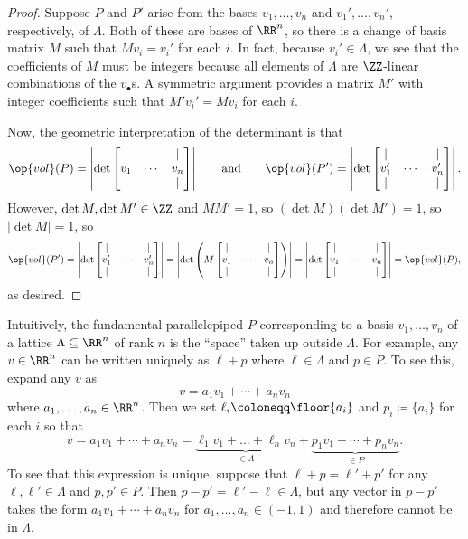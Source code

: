 \documentclass[../notes.tex]{subfiles}
\begin{document}
\begin{proof}
	Suppose $P$ and $P'$ arise from the bases $v_1,\ldots,v_n$ and $v_1',\ldots,v_n'$, respectively, of $\Lambda$. Both of these are bases of $\RR^n$, so there is a change of basis matrix $M$ such that $Mv_i=v_i'$ for each $i$. In fact, because $v_i'\in\Lambda$, we see that the coefficients of $M$ must be integers because all elements of $\Lambda$ are $\ZZ$-linear combinations of the $v_\bullet$s. A symmetric argument provides a matrix $M'$ with integer coefficients such that $M'v_i'=Mv_i$ for each $i$.

	Now, the geometric interpretation of the determinant is that
	\[\op{vol}(P)=\left|\det\begin{bmatrix}
		| & & | \\
		v_1 & \cdots & v_n \\
		| & & |
	\end{bmatrix}\right|\qquad\text{and}\qquad\op{vol}(P')=\left|\det\begin{bmatrix}
		| & & | \\
		v_1' & \cdots & v_n' \\
		| & & |
	\end{bmatrix}\right|.\]
	However, $\det M,\det M'\in\ZZ$ and $MM'=1$, so $(\det M)(\det M')=1$, so $\left|\det M\right|=1$, so
	\[\op{vol}(P')=\left|\det\begin{bmatrix}
		| & & | \\
		v_1' & \cdots & v_n' \\
		| & & |
	\end{bmatrix}\right|=\left|\det\left(M\begin{bmatrix}
		| & & | \\
		v_1 & \cdots & v_n \\
		| & & |
	\end{bmatrix}\right)\right|=\left|\det\begin{bmatrix}
		| & & | \\
		v_1 & \cdots & v_n \\
		| & & |
	\end{bmatrix}\right|=\op{vol}(P),\]
	as desired.
\end{proof}
\begin{remark} \label{rem:p-plus-lambda-is-space}
	Intuitively, the fundamental parallelepiped $P$ corresponding to a basis $v_1,\ldots,v_n$ of a lattice $\Lambda\subseteq\RR^n$ of rank $n$ is the ``space'' taken up outside $\Lambda$. For example, any $v\in\RR^n$ can be written uniquely as $\ell+p$ where $\ell\in\Lambda$ and $p\in P$. To see this, expand any $v$ as
	\[v=a_1v_1+\cdots+a_nv_n\]
	where $a_1,\ldots,a_n\in\RR^n$. Then we set $\ell_i\coloneqq\floor{a_i}$ and $p_i\coloneqq\{a_i\}$ for each $i$ so that
	\[v=a_1v_1+\cdots+a_nv_n=\underbrace{\ell_1v_1+\ldots+\ell_nv_n}_{\in\Lambda}+\underbrace{p_1v_1+\cdots+p_nv_n}_{\in P}.\]
	To see that this expression is unique, suppose that $\ell+p=\ell'+p'$ for any $\ell,\ell'\in\Lambda$ and $p,p'\in P$. Then $p-p'=\ell'-\ell\in\Lambda$, but any vector in $p-p'$ takes the form $a_1v_1+\cdots+a_nv_n$ for $a_1,\ldots,a_n\in(-1,1)$ and therefore cannot be in $\Lambda$.
\end{remark}
\end{document}
